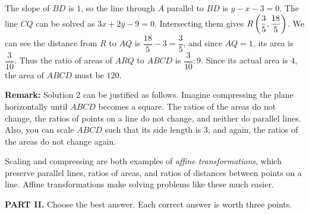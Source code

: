 \documentclass[11pt,paper=letter]{scrartcl}
\begin{document}
\begin{enumerate}[left=0pt]
The slope of $BD$ is $1$, so the line through $A$ parallel to $BD$ is $y - x - 3 = 0$. The line $CQ$ can be solved as $3x + 2y - 9 = 0$. Intersecting them gives $R\left( \dfrac35, \dfrac{18}5 \right)$. We can see the distance from $R$ to $AQ$ is $\dfrac{18}5 - 3 = \dfrac35$, and since $AQ = 1$, its area is $\dfrac3{10}$. Thus the ratio of areas of $ARQ$ to $ABCD$ is $\dfrac3{10} : 9$. Since its actual area is $4$, the area of $ABCD$ must be $120$.
\begin{center}
\end{center}

\textbf{Remark:} Solution 2 can be justified as follows. Imagine compressing the plane horizontally until $ABCD$ becomes a square. The ratios of the areas do not change, the ratios of points on a line do not change, and neither do parallel lines. Also, you can scale $ABCD$ such that its side length is $3$, and again, the ratios of the areas do not change again.

Scaling and compressing are both examples of \emph{affine transformations}, which preserve parallel lines, ratios of areas, and ratios of distances between points on a line. Affine transformations make solving problems like these much easier.

\end{enumerate}

\noindent\textbf{PART II.} Choose the best answer. Each correct answer is worth three points.
\end{document}
